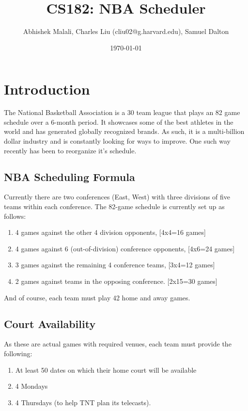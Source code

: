 \documentclass{article}
\begin{document}
	\title{CS182: NBA Scheduler}
	\author{Abhishek Malali, Charles Liu (cliu02@g.harvard.edu), Samuel Dalton}
	\date{\today}
	\maketitle
	
	\section{Introduction}
	
	The National Basketball Association is a 30 team league that plays an 82 game schedule over a 6-month period. It showcases some of the best athletes in the world and has generated globally recognized brands. As such, it is a multi-billion dollar industry and is constantly looking for ways to improve. One such way recently has been to reorganize it's schedule.
	
	\subsection{NBA Scheduling Formula}

	Currently there are two conferences (East, West) with three divisions of five teams within each conference. The 82-game schedule is currently set up as follows:

	\begin{enumerate}
		\item 4 games against the other 4 division opponents, [4x4=16 games]
		\item 4 games against 6 (out-of-division) conference opponents, [4x6=24 games]
		\item 3 games against the remaining 4 conference teams, [3x4=12 games]
		\item 2 games against teams in the opposing conference. [2x15=30 games]
	\end{enumerate}

	And of course, each team must play 42 home and away games. 
	
	\subsection{Court Availability}

	As these are actual games with required venues, each team must provide the following:

	\begin{enumerate}
		\item At least 50 dates on which their home court will be available
		\item 4 Mondays
		\item 4 Thursdays (to help TNT plan its telecasts).
	\end{enumerate}
\end{document}
